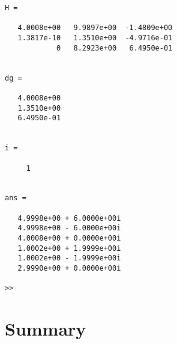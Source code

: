\begin{verbatim}
H =

   4.0008e+00   9.9897e+00  -1.4809e+00
   1.3817e-10   1.3510e+00  -4.9716e-01
            0   8.2923e+00   6.4950e-01


dg =

   4.0008e+00
   1.3510e+00
   6.4950e-01


i =

     1


ans =

   4.9998e+00 + 6.0000e+00i
   4.9998e+00 - 6.0000e+00i
   4.0008e+00 + 0.0000e+00i
   1.0002e+00 + 1.9999e+00i
   1.0002e+00 - 1.9999e+00i
   2.9990e+00 + 0.0000e+00i

>> 
\end{verbatim}

\section{Summary}